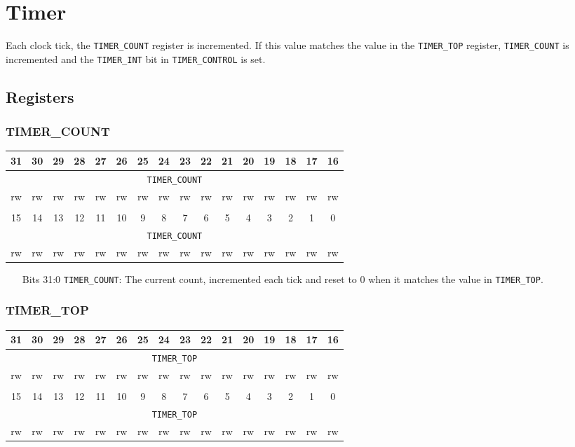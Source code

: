 \documentclass[11pt,openany]{report}
\begin{document}
\section{Timer}
Each clock tick, the \verb|TIMER_COUNT| register is incremented. If
this value matches the value in the \verb|TIMER_TOP| register,
\verb|TIMER_COUNT| is incremented and the \verb|TIMER_INT| bit in
\verb|TIMER_CONTROL| is set.

\subsection{Registers}
\subsubsection{TIMER\_COUNT}

\centering
\begin{tabular}{|c|c|c|c|c|c|c|c|c|c|c|c|c|c|c|c|}
  \hline
  31 & 30 & 29 & 28 & 27 & 26 & 25 & 24 & 23 & 22 & 21 & 20 & 19 & 18 & 17 & 16 \\
  \hline
  \multicolumn{16}{|c|}{\texttt{TIMER\_COUNT}}\\
  \hline
  rw & rw & rw & rw & rw & rw & rw & rw & rw & rw & rw & rw & rw & rw & rw & rw\\
  \hline
  \multicolumn{16}{c}{}\\
  \hline
  15 & 14 & 13 & 12 & 11 & 10 & 9 & 8 & 7 & 6 & 5 & 4 & 3 & 2 & 1 & 0 \\
  \hline
  \multicolumn{16}{|c|}{\texttt{TIMER\_COUNT}}\\
  \hline
  rw & rw & rw & rw & rw & rw & rw & rw & rw & rw & rw & rw & rw & rw & rw & rw\\
  \hline
\end{tabular}

\begin{enumerate}
\item[Bits 31:0] \verb|TIMER_COUNT|: The current count, incremented
  each tick and reset to 0 when it matches the value in
  \verb|TIMER_TOP|.
\end{enumerate}

\subsubsection{TIMER\_TOP}
\centering
\begin{tabular}{|c|c|c|c|c|c|c|c|c|c|c|c|c|c|c|c|}
  \hline
  31 & 30 & 29 & 28 & 27 & 26 & 25 & 24 & 23 & 22 & 21 & 20 & 19 & 18 & 17 & 16 \\
  \hline
  \multicolumn{16}{|c|}{\texttt{TIMER\_TOP}}\\
  \hline
  rw & rw & rw & rw & rw & rw & rw & rw & rw & rw & rw & rw & rw & rw & rw & rw\\
  \hline
  \multicolumn{16}{c}{}\\
  \hline
  15 & 14 & 13 & 12 & 11 & 10 & 9 & 8 & 7 & 6 & 5 & 4 & 3 & 2 & 1 & 0 \\
  \hline
  \multicolumn{16}{|c|}{\texttt{TIMER\_TOP}}\\
  \hline
  rw & rw & rw & rw & rw & rw & rw & rw & rw & rw & rw & rw & rw & rw & rw & rw\\
  \hline
\end{tabular}
\end{document}
